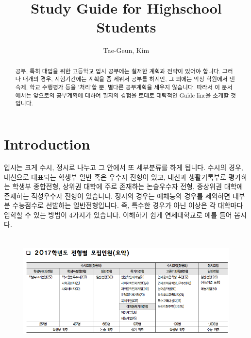 \documentclass[final]{IEEEphot}
\begin{document}
\title{Study Guide for Highschool Students}

\author{Tae-Geun, Kim}


\maketitle


\begin{abstract}
 공부, 특히 대입을 위한 고등학교 입시 공부에는 철저한 계획과 전략이 있어야 합니다. 그러나 대개의 경우, 시험기간에는 계획을 좀 세워서 공부를 하지만,
 그 외에는 막상 학원에서 낸 숙제, 학교 수행평가 등을 '처리'할 뿐, 별다른 공부계획을 세우지 않습니다. 따라서 이 문서에서는 앞으로의 공부계획에 대하여
 필자의 경험을 토대로 대략적인 Guide line을 소개할 것입니다.
\end{abstract}


\section{Introduction}

\hspace{0.3cm} 입시는 크게 수시, 정시로 나누고 그 안에서 또 세부분류를 하게 됩니다. 수시의 경우, 내신으로 대표되는 학생부 일반 혹은 우수자 전형이 있고, 내신과 생활기록부로 평가하는
학생부 종합전형, 상위권 대학에 주로 존재하는 논술우수자 전형, 중상위권 대학에 존재하는 적성우수자 전형이 있습니다. 정시의 경우는 예체능의 경우를 제외하면
대부분 수능점수로 선발하는 일반전형입니다. 즉, 특수한 경우가 아닌 이상은 각 대학마다 입학할 수 있는 방법이 4가지가 있습니다. 이해하기 쉽게 연세대학교로 예를 들어 봅시다.

\begin{figure}[h]
\centering
 \includegraphics[height = 6cm, width = 14cm]{Yonsei.png}
\end{figure}
\end{document}
